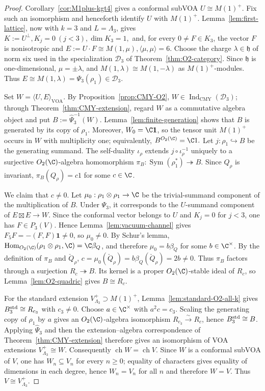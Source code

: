 \documentclass[12pt,leqno]{amsart}
\numberwithin{equation}{section} \newtheorem{thm}{Theorem}[section] \newtheorem{lem}[thm]{Lemma} \newtheorem{ex}[thm]{Example} \newtheorem{prop}[thm]{Proposition} \newtheorem{cor}[thm]{Corollary} \newtheorem{defi}[thm]{Definition} \newtheorem{rmk}[thm]{Remark} \newtheorem{notation}[thm]{Notation}
\newcommand{\one}{\mathbf{1}}
\newcommand{\Sym}{\operatorname{Sym}}
\newcommand{\Hom}{\operatorname{Hom}}
\newcommand{\ch}{\operatorname{ch}}
\newcommand{\IndCMY}{\operatorname{Ind}_{\mathrm{CMY}}}
\newcommand{\Otwo}{O_2(\C)}
\begin{document}
\begin{proof}
Corollary~\ref{cor:M1plus-kgt4} gives a conformal subVOA \(U\cong M(1)^+.\) Fix such an isomorphism and henceforth identify $U$ with $M(1)^+$. Lemma~\ref{lem:first-lattice}, now with $k=3$ and $L=\Lambda_3$, gives \(K:=U^\perp, K_j=0\ (j<3), \dim K_3=1,\) and, for every $0\ne F\in K_3$, the vector $F$ is nonisotropic and \(E:=U\cdot F\cong M(1,\mu), \langle\mu,\mu\rangle=6.\) Choose the charge $\lambda\in\mathfrak h$ of norm six used in the specialization $\mathcal D_3$ of Theorem~\ref{thm:O2-category}. Since $\mathfrak h$ is one-dimensional, $\mu=\pm\lambda$, and $M(1,\lambda)\cong M(1,-\lambda)$ as $M(1)^+$-modules. Thus \(E\cong M(1,\lambda)=\Psi_3(\rho_1)\in\mathcal D_3.\)

Set \(W=\langle U,E\rangle_{\mathrm{VOA}}\). By Proposition~\ref{prop:CMY-O2}, $W\in\IndCMY(\mathcal D_3)$; through Theorem~\ref{thm:CMY-extension}, regard $W$ as a commutative algebra object and put \(B:=\widehat\Psi_3^{-1}(W).\) Lemma~\ref{lem:finite-generation} shows that $B$ is generated by its copy of $\rho_1$. Moreover, $W_0=\C\one$, so the tensor unit $M(1)^+$ occurs in $W$ with multiplicity one; equivalently, \(B^{\Otwo}=\C1.\) Let \(j:\rho_1\hookrightarrow B\) be the generating summand. The self-duality $\iota_\rho$ extends $j\circ\iota_\rho^{-1}$ uniquely to a surjective $\Otwo$-algebra homomorphism \(\pi_B:\Sym(\rho_1^*)\twoheadrightarrow B.\) Since $Q_\rho$ is invariant, \(\pi_B(Q_\rho)=c1\) for some $c\in\C$.

We claim that $c\ne0$. Let \(\mu_0:\rho_1\otimes\rho_1\to\C\) be the trivial-summand component of the multiplication of $B$. Under $\Psi_3$, it corresponds to the $U$-summand component of \(E\boxtimes E\to W\). Since the conformal vector belongs to $U$ and $K_j=0$ for $j<3$, one has $F\in P_3(V)$. Hence Lemma~\ref{lem:vacuum-channel} gives \(F_5F=-(F,F)\one\ne0\), so $\mu_0\ne0$. By Schur's lemma, \(\Hom_{\Otwo}(\rho_1\otimes\rho_1,\C)=\C\beta_Q\), and therefore \(\mu_0=b\beta_Q\) for some $b\in\C^\times$. By the definition of $\pi_B$ and $\check Q_\rho$, \(c=\mu_0(\check Q_\rho)=b \beta_Q(\check Q_\rho)=2b\ne0.\) Thus $\pi_B$ factors through a surjection \(R_c\twoheadrightarrow B\). Its kernel is a proper $\Otwo$-stable ideal of $R_c$, so Lemma~\ref{lem:O2-quadric} gives \(B\cong R_c\).

For the standard extension $V_{\Lambda_3}^+\supset M(1)^+$, Lemma~\ref{lem:standard-O2-all-k} gives \(B_3^{\rm std}\cong R_{c_3}\) with $c_3\ne0$. Choose $a\in\C^\times$ with $a^2c=c_3$. Scaling the generating copy of $\rho_1$ by $a$ gives an $\Otwo$-algebra isomorphism \(R_{c_3}\overset\sim\longrightarrow R_c\), hence \(B_3^{\rm std}\cong B\). Applying $\widehat\Psi_3$ and then the extension--algebra correspondence of Theorem~\ref{thm:CMY-extension} therefore gives an isomorphism of VOA extensions \(V_{\Lambda_3}^+\cong W\). Consequently \(\ch W=\ch V\). Since $W$ is a conformal subVOA of $V$, one has $W_n\subseteq V_n$ for every $n\ge0$; equality of characters gives equality of dimensions in each degree, hence $W_n=V_n$ for all $n$ and therefore $W=V$. Thus \(V\cong V_{\Lambda_3}^+\).
\end{proof}
\end{document}
